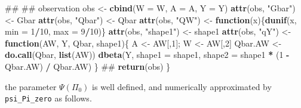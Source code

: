 \documentclass[]{article}
\newenvironment{Shaded}{\begin{snugshade}}{\end{snugshade}}
\newcommand{\ControlFlowTok}[1]{\textcolor[rgb]{0.13,0.29,0.53}{\textbf{#1}}}
\newcommand{\DataTypeTok}[1]{\textcolor[rgb]{0.13,0.29,0.53}{#1}}
\newcommand{\DecValTok}[1]{\textcolor[rgb]{0.00,0.00,0.81}{#1}}
\newcommand{\KeywordTok}[1]{\textcolor[rgb]{0.13,0.29,0.53}{\textbf{#1}}}
\newcommand{\NormalTok}[1]{#1}
\newcommand{\OperatorTok}[1]{\textcolor[rgb]{0.81,0.36,0.00}{\textbf{#1}}}
\newcommand{\StringTok}[1]{\textcolor[rgb]{0.31,0.60,0.02}{#1}}
\theoremstyle{definition}
\theoremstyle{definition}
\theoremstyle{definition}
\theoremstyle{remark}
\begin{document}
\begin{Shaded}
\begin{Highlighting}[]
\NormalTok{  ## ## observation}
\NormalTok{  obs <-}\StringTok{ }\KeywordTok{cbind}\NormalTok{(}\DataTypeTok{W =}\NormalTok{ W, }\DataTypeTok{A =}\NormalTok{ A, }\DataTypeTok{Y =}\NormalTok{ Y)}
  \KeywordTok{attr}\NormalTok{(obs, }\StringTok{"Gbar"}\NormalTok{) <-}\StringTok{ }\NormalTok{Gbar}
  \KeywordTok{attr}\NormalTok{(obs, }\StringTok{"Qbar"}\NormalTok{) <-}\StringTok{ }\NormalTok{Qbar}
  \KeywordTok{attr}\NormalTok{(obs, }\StringTok{"QW"}\NormalTok{) <-}\StringTok{ }\ControlFlowTok{function}\NormalTok{(x)\{}\KeywordTok{dunif}\NormalTok{(x, }\DataTypeTok{min =} \DecValTok{1}\OperatorTok{/}\DecValTok{10}\NormalTok{, }\DataTypeTok{max =} \DecValTok{9}\OperatorTok{/}\DecValTok{10}\NormalTok{)\}}
  \KeywordTok{attr}\NormalTok{(obs, }\StringTok{"shape1"}\NormalTok{) <-}\StringTok{ }\NormalTok{shape1}
  \KeywordTok{attr}\NormalTok{(obs, }\StringTok{"qY"}\NormalTok{) <-}\StringTok{ }\ControlFlowTok{function}\NormalTok{(AW, Y, Qbar, shape1)\{}
\NormalTok{    A <-}\StringTok{ }\NormalTok{AW[,}\DecValTok{1}\NormalTok{]; W <-}\StringTok{ }\NormalTok{AW[,}\DecValTok{2}\NormalTok{]}
\NormalTok{    Qbar.AW <-}\StringTok{ }\KeywordTok{do.call}\NormalTok{(Qbar, }\KeywordTok{list}\NormalTok{(AW))}
    \KeywordTok{dbeta}\NormalTok{(Y, }\DataTypeTok{shape1 =}\NormalTok{ shape1, }\DataTypeTok{shape2 =}\NormalTok{ shape1 }\OperatorTok{*}\StringTok{ }\NormalTok{(}\DecValTok{1} \OperatorTok{-}\StringTok{ }\NormalTok{Qbar.AW) }\OperatorTok{/}\StringTok{ }\NormalTok{Qbar.AW)}
\NormalTok{  \}}
\NormalTok{  ##}
  \KeywordTok{return}\NormalTok{(obs)}
\NormalTok{\}}
\end{Highlighting}
\end{Shaded}

the parameter \(\Psi(\Pi_{0})\) is well defined, and numerically
approximated by \texttt{psi\_Pi\_zero} as follows.

\begin{Shaded}
\end{Shaded}
\end{document}
